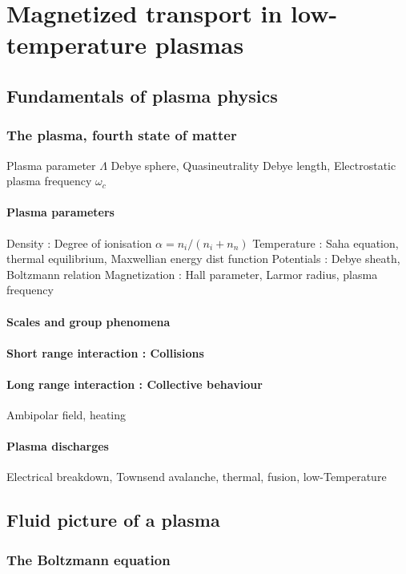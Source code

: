 \clearemptydoublepage
\chapter{Magnetized transport in low-temperature plasmas}
	\section{Fundamentals of plasma physics}
		\subsection{The plasma, fourth state of matter}
		Plasma parameter $\Lambda$ Debye sphere, Quasineutrality Debye length, Electrostatic plasma frequency $\omega_c$
			\subsubsection{Plasma parameters}
			Density : Degree of ionisation $\alpha=n_i/(n_i+n_n)$
			Temperature : Saha equation, thermal equilibrium, Maxwellian energy dist function
			Potentials : Debye sheath, Boltzmann relation
			Magnetization : Hall parameter, Larmor radius, plasma frequency
			\subsubsection{Scales and group phenomena}
			\subsubsection{Short range interaction : Collisions}
			\subsubsection{Long range interaction : Collective behaviour}
			Ambipolar field, heating
			\subsubsection{Plasma discharges}
			Electrical breakdown, Townsend avalanche, thermal, fusion, low-Temperature
	\section{Fluid picture of a plasma}
		\subsection{The Boltzmann equation}
